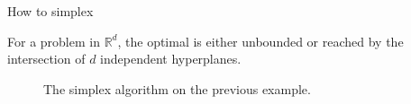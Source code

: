 \begin{frame}{How to simplex}
\begin{theorem}
For a problem in $\mathbb{R}^d$, the optimal is either unbounded or reached by the intersection of $d$ independent hyperplanes.
\end{theorem}


\begin{figure}

The simplex algorithm on the previous example.
\end{figure}  

\end{frame}

